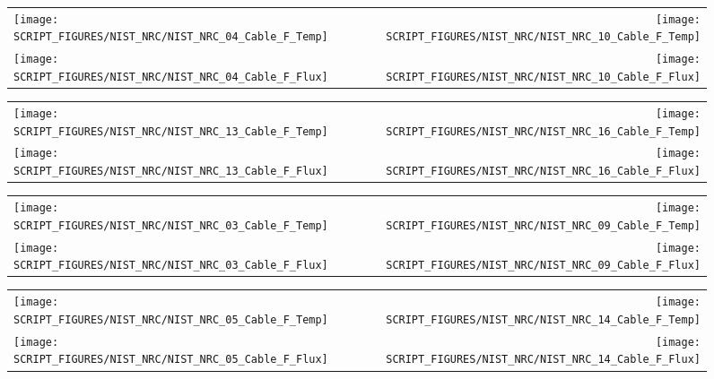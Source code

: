 \clearpage

\begin{figure}[!ht]
\begin{tabular*}{\textwidth}{l@{\extracolsep{\fill}}r}
\texttt{[image: SCRIPT\_FIGURES/NIST\_NRC/NIST\_NRC\_04\_Cable\_F\_Temp]} &
\texttt{[image: SCRIPT\_FIGURES/NIST\_NRC/NIST\_NRC\_10\_Cable\_F\_Temp]} \\
\texttt{[image: SCRIPT\_FIGURES/NIST\_NRC/NIST\_NRC\_04\_Cable\_F\_Flux]} &
\texttt{[image: SCRIPT\_FIGURES/NIST\_NRC/NIST\_NRC\_10\_Cable\_F\_Flux]}
\end{tabular*}
\label{NIST_NRC_F_4_and_10}
\end{figure}

\begin{figure}[!ht]
\begin{tabular*}{\textwidth}{l@{\extracolsep{\fill}}r}
\texttt{[image: SCRIPT\_FIGURES/NIST\_NRC/NIST\_NRC\_13\_Cable\_F\_Temp]} &
\texttt{[image: SCRIPT\_FIGURES/NIST\_NRC/NIST\_NRC\_16\_Cable\_F\_Temp]} \\
\texttt{[image: SCRIPT\_FIGURES/NIST\_NRC/NIST\_NRC\_13\_Cable\_F\_Flux]} &
\texttt{[image: SCRIPT\_FIGURES/NIST\_NRC/NIST\_NRC\_16\_Cable\_F\_Flux]}
\end{tabular*}
\label{NIST_NRC_F_13_and_16}
\end{figure}

\clearpage

\begin{figure}[!ht]
\begin{tabular*}{\textwidth}{l@{\extracolsep{\fill}}r}
\texttt{[image: SCRIPT\_FIGURES/NIST\_NRC/NIST\_NRC\_03\_Cable\_F\_Temp]} &
\texttt{[image: SCRIPT\_FIGURES/NIST\_NRC/NIST\_NRC\_09\_Cable\_F\_Temp]} \\
\texttt{[image: SCRIPT\_FIGURES/NIST\_NRC/NIST\_NRC\_03\_Cable\_F\_Flux]} &
\texttt{[image: SCRIPT\_FIGURES/NIST\_NRC/NIST\_NRC\_09\_Cable\_F\_Flux]}
\end{tabular*}
\label{NIST_NRC_F_3_and_9}
\end{figure}

\begin{figure}[!ht]
\begin{tabular*}{\textwidth}{l@{\extracolsep{\fill}}r}
\texttt{[image: SCRIPT\_FIGURES/NIST\_NRC/NIST\_NRC\_05\_Cable\_F\_Temp]} &
\texttt{[image: SCRIPT\_FIGURES/NIST\_NRC/NIST\_NRC\_14\_Cable\_F\_Temp]} \\
\texttt{[image: SCRIPT\_FIGURES/NIST\_NRC/NIST\_NRC\_05\_Cable\_F\_Flux]} &
\texttt{[image: SCRIPT\_FIGURES/NIST\_NRC/NIST\_NRC\_14\_Cable\_F\_Flux]}
\end{tabular*}
\label{NIST_NRC_F_5_and_14}
\end{figure}


